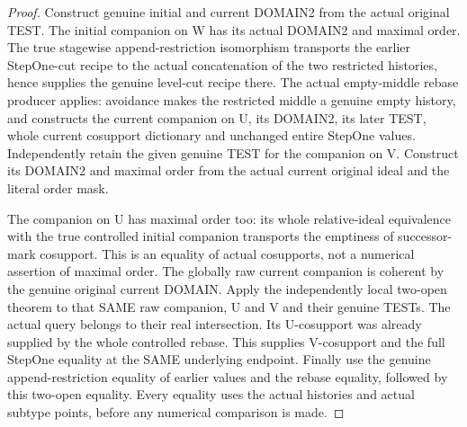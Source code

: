 \begin{proof}
Construct genuine initial and current DOMAIN2 from the actual original
TEST. The initial companion on W has its actual DOMAIN2 and maximal order.
The true stagewise append-restriction isomorphism transports the earlier
StepOne-cut recipe to the actual concatenation of the two restricted
histories, hence supplies the genuine level-cut recipe there. The actual
empty-middle rebase producer applies: avoidance makes the restricted middle
a genuine empty history, and constructs the current companion on U,
its DOMAIN2, its later TEST, whole current cosupport dictionary and
unchanged entire StepOne values. Independently retain the given genuine
TEST for the companion on V. Construct its DOMAIN2 and maximal order from
the actual current original ideal and the literal order mask.

The companion on U has maximal order too: its whole relative-ideal
equivalence with the true controlled initial companion transports the
emptiness of successor-mark cosupport. This is an equality of actual
cosupports, not a numerical assertion of maximal order. The globally raw
current companion is coherent by the genuine original current DOMAIN.
Apply the independently local two-open theorem to that SAME raw companion,
U and V and their genuine TESTs. The actual query belongs to their real
intersection. Its U-cosupport was already supplied by the whole controlled
rebase. This supplies V-cosupport and the full StepOne equality at the SAME
underlying endpoint. Finally use the genuine append-restriction equality
of earlier values and the rebase equality, followed by this two-open
equality. Every equality uses the actual histories and actual subtype
points, before any numerical comparison is made.
\end{proof}

